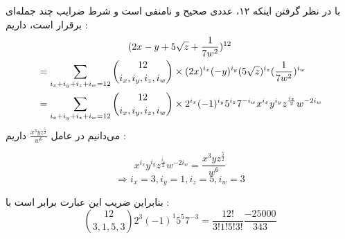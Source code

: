 

\p
با در نظر گرفتن اینکه ۱۲، عددی صحیح و نا‌منفی است و شرط 
 ضرایب چند جمله‌ای برقرار است، داریم :
  \begin{align*}
    (2x - y + 5\sqrt{z} + \frac{1}{7w^2})^{12} \span \\
    &= \sum\limits_{i_x+i_y+i_z+i_w=12} \binom{12}{i_x,i_y,i_z,i_w} \times (2x)^{i_x} (-y)^{i_y} (5\sqrt{z})^{i_z} (\frac{1}{7w^2})^{i_w} \\
    &= \sum\limits_{i_x+i_y+i_z+i_w=12} \binom{12}{i_x,i_y,i_z,i_w} \times 2^{i_x} (-1)^{i_y} 5^{i_z} 7^{-i_w} x^{i_x} y^{i_y} z^{\frac{i_z}{2}} w^{-2i_w}
  \end{align*}
می‌دانیم در عامل 
$\frac{x^3 y z^{\frac{5}{2}}}{w^6}$
داریم :

$$x^{i_x} y^{i_y} z^{\frac{i_z}{2}} w^{-2i_w} = \frac{x^3 y z^{\frac{5}{2}}}{w^6}$$
$$\Rightarrow i_x = 3 , i_y = 1 , i_z = 5 , i_w = 3$$

بنابراین ضریب این عبارت برابر است با :
$$\binom{12}{3,1,5,3} 2^3 (-1)^1 5^5 7^{-3} = \frac{12!}{3!1!5!3!} \frac{-25000}{343}$$